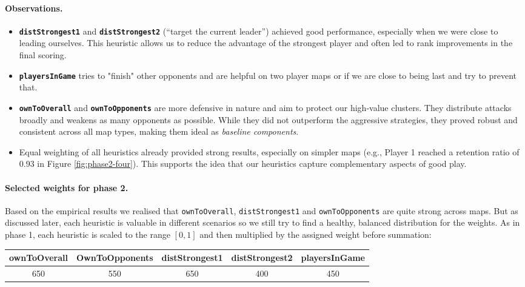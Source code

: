\paragraph{Observations.}
\begin{itemize}
    \item \textbf{\texttt{distStrongest1}} and \textbf{\texttt{distStrongest2}} (“target the current leader”) achieved good performance, especially when we were close to leading ourselves. This heuristic allows us to reduce the advantage of the strongest player and often led to rank improvements in the final scoring.
    \item \textbf{\texttt{playersInGame}} tries to "finish" other opponents and are helpful on two player maps or if we are close to being last and try to prevent that.
    \item \textbf{\texttt{ownToOverall}} and \textbf{\texttt{ownToOpponents}} are more defensive in nature and aim to protect our high-value clusters. They distribute attacks broadly and weakens as many opponents as possible. While they did not outperform the aggressive strategies, they proved robust and consistent across all map types, making them ideal as \emph{baseline components}.
    \item Equal weighting of all heuristics already provided strong results, especially on simpler maps (e.g., Player 1 reached a retention ratio of 0.93 in Figure \ref{fig:phase2-four}). This supports the idea that our heuristics capture complementary aspects of good play.
\end{itemize}

\paragraph{Selected weights for phase 2.}
Based on the empirical results we realised that \texttt{ownToOverall}, \texttt{distStrongest1} and \texttt{ownToOpponents} are quite strong across maps. But as discussed later, each heuristic is valuable in different scenarios so we still try to find a healthy, balanced distribution for the weights. As in phase 1, each heuristic is scaled to the range $[0,1]$ and then multiplied by the assigned weight before summation:

\begin{center}
\begin{tabular}{|c c c c c|} 
 \hline
 ownToOverall & OwnToOpponents & distStrongest1 & distStrongest2 & playersInGame \\  
 \hline\hline
 650 & 550 & 650 & 400 & 450\\ 
 \hline
\end{tabular}
\end{center}


